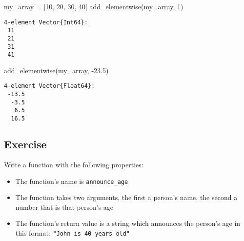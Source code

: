 \documentclass[
  letterpaper,
  DIV=11,
  numbers=noendperiod]{scrartcl}
\newenvironment{Shaded}{\begin{snugshade}}{\end{snugshade}}
\newcommand{\FloatTok}[1]{\textcolor[rgb]{0.68,0.00,0.00}{#1}}
\newcommand{\FunctionTok}[1]{\textcolor[rgb]{0.28,0.35,0.67}{#1}}
\newcommand{\NormalTok}[1]{\textcolor[rgb]{0.00,0.23,0.31}{#1}}
\newcommand{\OperatorTok}[1]{\textcolor[rgb]{0.37,0.37,0.37}{#1}}
\providecommand{\tightlist}{%
  \setlength{\itemsep}{0pt}\setlength{\parskip}{0pt}}\usepackage{longtable,booktabs,array}
\begin{document}
\begin{Shaded}
\begin{Highlighting}[]
\NormalTok{my\_array }\OperatorTok{=}\NormalTok{ [}\FloatTok{10}\NormalTok{, }\FloatTok{20}\NormalTok{, }\FloatTok{30}\NormalTok{, }\FloatTok{40}\NormalTok{]}
\FunctionTok{add\_elementwise}\NormalTok{(my\_array, }\FloatTok{1}\NormalTok{)}
\end{Highlighting}
\end{Shaded}

\begin{verbatim}
4-element Vector{Int64}:
 11
 21
 31
 41
\end{verbatim}

\begin{Shaded}
\begin{Highlighting}[]
\FunctionTok{add\_elementwise}\NormalTok{(my\_array, }\OperatorTok{{-}}\FloatTok{23.5}\NormalTok{)}
\end{Highlighting}
\end{Shaded}

\begin{verbatim}
4-element Vector{Float64}:
 -13.5
  -3.5
   6.5
  16.5
\end{verbatim}

\subsection{Exercise}\label{exercise}

Write a function with the following properties:

\begin{itemize}
\tightlist
\item
  The function's name is \texttt{announce\_age}
\item
  The function takes two arguments, the first a person's name, the
  second a number that is that person's age
\item
  The function's return value is a string which announces the person's
  age in this format: \texttt{"John\ is\ 40\ years\ old"}
\end{itemize}
\end{document}
